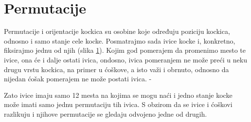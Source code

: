 \documentclass[a4paper]{article}
\begin{document}
\section{Permutacije}
\label{permutacije}

Permutacije i orijentacije kockica su osobine koje određuju poziciju kockica, odnosno i samo stanje cele kocke.
Posmatrajmo sada ivice kocke i, konkretno, fiksirajmo jednu od njih (slika \ref{fig:ivica-pomeranje}). Kojim god pomerajem da promenimo mesto te ivice, ona će i dalje ostati ivica, ondosno, ivica pomeranjem ne može preći u neku drugu vrstu kockica, na primer u ćoškove, a isto važi i obrnuto, odnosno da nijedan ćošak pomerajem ne može postati ivica.
-
\begin{figure}[h]
        \centering
        \caption{}
        \label{fig:ivica-pomeranje}
    \end{figure}

Zato ivice imaju samo 12 mesta na kojima se mogu naći i jedno stanje kocke može imati samo jednu permutaciju tih ivica. S obzirom da se ivice i ćoškovi razlikuju i njihove permutacije se gledaju odvojeno jedne od drugih.
\end{document}
